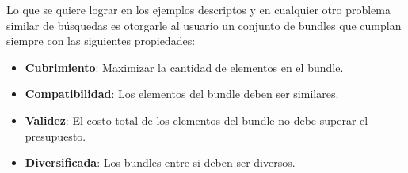 Lo que se quiere lograr en los ejemplos descriptos y en cualquier otro problema similar de búsquedas es otorgarle al usuario un conjunto de bundles que cumplan siempre con las siguientes propiedades: 
\begin{itemize}
  \item \textbf{Cubrimiento}: Maximizar la cantidad de elementos en el bundle.
  \item \textbf{Compatibilidad}: Los elementos del bundle deben ser similares.
  \item \textbf{Validez}: El costo total de los elementos del bundle no debe superar el presupuesto.
  \item \textbf{Diversificada}: Los bundles entre si deben ser diversos.
\end{itemize}
